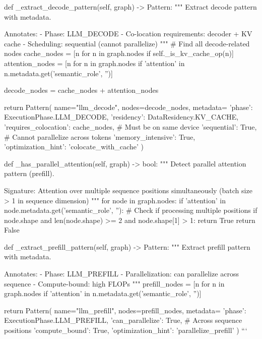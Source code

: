     def _extract_decode_pattern(self, graph) -> Pattern:
        """
        Extract decode pattern with metadata.
        
        Annotates:
        - Phase: LLM_DECODE
        - Co-location requirements: decoder + KV cache
        - Scheduling: sequential (cannot parallelize)
        """
        # Find all decode-related nodes
        cache_nodes = [n for n in graph.nodes if self._is_kv_cache_op(n)]
        attention_nodes = [n for n in graph.nodes 
                          if 'attention' in n.metadata.get('semantic_role', '')]
        
        decode_nodes = cache_nodes + attention_nodes
        
        return Pattern(
            name="llm_decode",
            nodes=decode_nodes,
            metadata={
                'phase': ExecutionPhase.LLM_DECODE,
                'residency': DataResidency.KV_CACHE,
                'requires_colocation': cache_nodes,  # Must be on same device
                'sequential': True,  # Cannot parallelize across tokens
                'memory_intensive': True,
                'optimization_hint': 'colocate_with_cache'
            }
        )
    
    def _has_parallel_attention(self, graph) -> bool:
        """
        Detect parallel attention pattern (prefill).
        
        Signature: Attention over multiple sequence positions simultaneously
        (batch size > 1 in sequence dimension)
        """
        for node in graph.nodes:
            if 'attention' in node.metadata.get('semantic_role', ''):
                # Check if processing multiple positions
                if node.shape and len(node.shape) >= 2 and node.shape[1] > 1:
                    return True
        return False
    
    def _extract_prefill_pattern(self, graph) -> Pattern:
        """
        Extract prefill pattern with metadata.
        
        Annotates:
        - Phase: LLM_PREFILL
        - Parallelization: can parallelize across sequence
        - Compute-bound: high FLOPs
        """
        prefill_nodes = [n for n in graph.nodes
                        if 'attention' in n.metadata.get('semantic_role', '')]
        
        return Pattern(
            name="llm_prefill",
            nodes=prefill_nodes,
            metadata={
                'phase': ExecutionPhase.LLM_PREFILL,
                'can_parallelize': True,  # Across sequence positions
                'compute_bound': True,
                'optimization_hint': 'parallelize_prefill'
            }
        )
```

